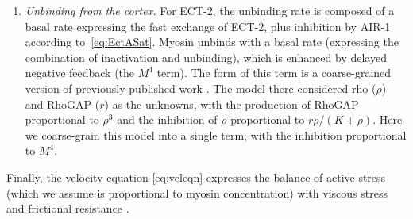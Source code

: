 \documentclass[11pt]{article}
\begin{document}
\begin{appendix}
\begin{enumerate}
\item \emph{Unbinding from the cortex.} For ECT-2, the unbinding rate is composed of a basal rate expressing the fast exchange of ECT-2, plus inhibition by AIR-1 according to\ \eqref{eq:EctASat}. Myosin unbinds with a basal rate (expressing the combination of inactivation and unbinding), which is enhanced by delayed negative feedback (the $M^4$ term). The form of this term is a coarse-grained version of previously-published work \citep{michaux2018excitable}. The model there considered rho ($\rho$) and RhoGAP ($r$) as the unknowns, with the production of RhoGAP proportional to $\rho^3$ and the inhibition of $\rho$ proportional to $r \rho/(K+\rho)$. Here we coarse-grain this model into a single term, with the inhibition proportional to $M^4$. 
\end{enumerate}
Finally, the velocity equation \eqref{eq:veleqn} expresses the balance of active stress (which we assume is proportional to myosin concentration) with viscous stress and frictional resistance \citep{mayer2010anisotropies}. 


\end{appendix}
\end{document}
